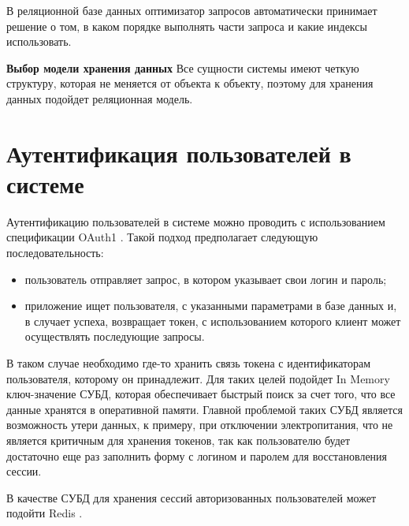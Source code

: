 В реляционной базе данных оптимизатор запросов автоматически принимает решение о том, в каком порядке выполнять части запроса и какие индексы использовать.

\textbf{Выбор модели хранения данных}
Все сущности системы имеют четкую структуру, которая не меняется от объекта к объекту, поэтому для хранения данных подойдет реляционная модель.

\section{Аутентификация пользователей в системе}

Аутентификацию пользователей в системе можно проводить с использованием спецификации OAuth1 \cite{oauth1}. Такой подход предполагает следующую последовательность:
\begin{itemize}
	\item пользователь отправляет запрос, в котором указывает свои логин и пароль;
	\item приложение ищет пользователя, с указанными параметрами в базе данных и, в случает успеха, возвращает токен, с использованием которого клиент может осуществлять последующие запросы.
\end{itemize}

В таком случае необходимо где-то хранить связь токена с идентификаторам пользователя, которому он принадлежит. Для таких целей подойдет In Memory ключ-значение СУБД, которая обеспечивает быстрый поиск за счет того, что все данные хранятся в оперативной памяти. Главной проблемой таких СУБД является возможность утери данных, к примеру, при отключении электропитания, что не является критичным для хранения токенов, так как пользователю будет достаточно еще раз заполнить форму с логином и паролем для восстановления сессии.

В качестве СУБД для хранения сессий авторизованных пользователей может подойти Redis \cite{redis}.
